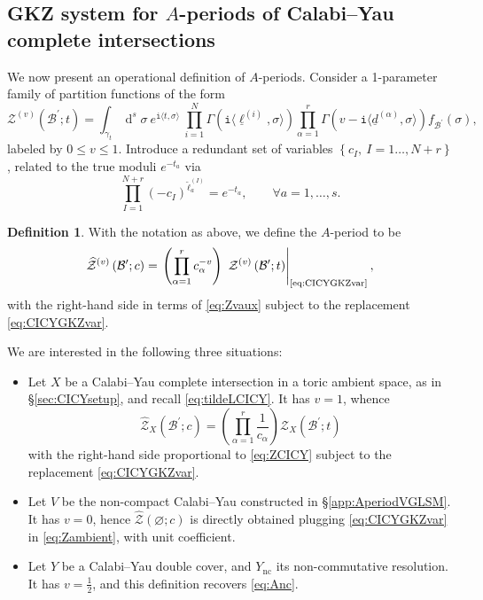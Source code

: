 \documentclass[12pt,a4paper,oneside]{amsart}
\numberwithin{equation}{section}
\theoremstyle{definition}
\newtheorem{defin}[thm]{Definition}
\theoremstyle{remark}
\DeclareMathOperator{\dd}{d}
\newcommand{\mz}{\mathcal{Z}}
\newcommand{\Br}{\mathcal{B}}
\newcommand{\Ync}{Y_{\mathrm{nc}}}
\newcommand{\pz}{\widehat{\mathcal{Z}}}
\newcommand{\ii}{\mathtt{i}}
\begin{document}
\begin{appendix}
\subsection{GKZ system for \texorpdfstring{$A$}{A}-periods of Calabi--Yau complete intersections}
\label{app:GKZCICY}
We now present an operational definition of $A$-periods. Consider a 1-parameter family of partition functions of the form
\begin{equation}
\label{eq:Zvaux}
    \mz^{(v)} \left( \Br^{\prime}; t \right)  = \int_{\gamma_t} \dd^s \sigma~e^{\ii \langle t, \sigma\rangle} ~\prod_{i=1}^{N} \Gamma \left(\ii \langle \underline{\ell}^{(i)}, \sigma \rangle \right) \prod_{\alpha=1}^{r} \Gamma \left( v -\ii \langle\underline{d}^{(\alpha)}, \sigma \rangle \right) f_{\Br^{\prime}} (\sigma) ,
\end{equation}
labeled by $0 \le v \le 1$. Introduce a redundant set of variables $\left\{ c_I , \ I=1 \dots, N+r \right\}$, related to the true moduli $e^{-t_a}$ via 
\begin{equation}
\label{eq:CICYGKZvar}
	\prod_{I=1}^{N+r} \left( - c_I \right)^{\tilde{\ell}_a ^{(I)}} = e^{-t_a} , \qquad \forall a=1, \dots, s .
\end{equation}
\begin{defin}
    With the notation as above, we define the $A$-period to be
    \begin{equation*}
        \pz^{(v)} \left( \Br^{\prime}; c \right)  = \left. \left( \prod_{\alpha=1}^{r} c_{\alpha}^{-v} \right) ~\mz^{(v)} \left( \Br^{\prime}; t \right)  \right\rvert_{\text{\eqref{eq:CICYGKZvar}}} ,
    \end{equation*}
    with the right-hand side in terms of \eqref{eq:Zvaux} subject to the replacement \eqref{eq:CICYGKZvar}.
\end{defin}\par
\medskip
We are interested in the following three situations:
\begin{itemize}
    \item Let $X$ be a Calabi--Yau complete intersection in a toric ambient space, as in \S\ref{sec:CICYsetup}, and recall \eqref{eq:tildeLCICY}. It has $v=1$, whence  
    \begin{equation}\label{eq:AperiodCICY}
        \pz_X \left( \Br^{\prime} ; c \right) = \left( \prod_{\alpha=1}^{r} \frac{1}{c_{\alpha}} \right) \mz_{X} \left( \Br^{\prime} ; t \right)
    \end{equation}
    with the right-hand side proportional to \eqref{eq:ZCICY} subject to the replacement \eqref{eq:CICYGKZvar}.
    \item Let $V$ be the non-compact Calabi--Yau constructed in \S\ref{app:AperiodVGLSM}. It has $v=0$, hence $\pz (\varnothing; c)$ is directly obtained plugging \eqref{eq:CICYGKZvar} in \eqref{eq:Zambient}, with unit coefficient.
    \item Let $Y$ be a Calabi--Yau double cover, and $\Ync$ its non-commutative resolution. It has $v=\frac{1}{2}$, and this definition recovers \eqref{eq:Anc}.
\end{itemize}\par


\end{appendix}
\end{document}
